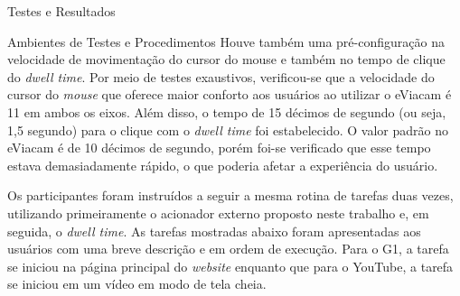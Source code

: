 \begin{chapter}{Testes e Resultados}
\begin{section}{Ambientes de Testes e Procedimentos}
Houve também uma pré-configuração na velocidade de movimentação do cursor do
mouse e também no tempo de clique do \textit{dwell time}. Por meio de testes
exaustivos, verificou-se que a velocidade do cursor do \textit{mouse} que
oferece maior conforto aos usuários ao utilizar o eViacam é 11 em ambos os eixos.
Além disso, o tempo de 15 décimos de segundo (ou seja, 1,5 segundo) para o
clique com o \textit{dwell time} foi estabelecido. O valor padrão no eViacam é
de 10 décimos de segundo, porém foi-se verificado que esse tempo estava
demasiadamente rápido, o que poderia afetar a experiência do usuário.

Os participantes foram instruídos a seguir a mesma rotina de tarefas duas vezes,
utilizando primeiramente o acionador externo proposto neste trabalho e, em
seguida, o \textit{dwell time}. As tarefas mostradas abaixo foram
apresentadas aos usuários com uma breve descrição e em ordem de execução.
Para o G1, a tarefa se iniciou na página principal do \textit{website} enquanto
que para o YouTube, a tarefa se iniciou em um vídeo em modo de tela cheia.  


\end{section}
\end{chapter}
